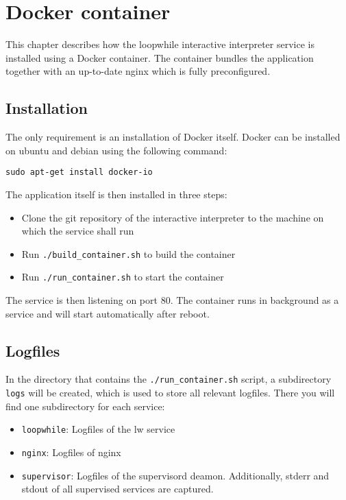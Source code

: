 \chapter{Docker container}
\label{chapter:docker}
This chapter describes how the loopwhile interactive interpreter service
is installed using a Docker container. The container bundles the application
together with an up-to-date nginx which is fully preconfigured.

\section{Installation}
The only requirement is an installation of Docker itself. Docker can be installed on
ubuntu and debian using the following command:

\begin{verbatim}
sudo apt-get install docker-io
\end{verbatim}

The application itself is then installed in three steps:
\begin{itemize}
\item Clone the git repository of the interactive interpreter to the machine
      on which the service shall run
\item Run \verb|./build_container.sh| to build the container
\item Run \verb|./run_container.sh| to start the container
\end{itemize}
The service is then listening on port 80. The container runs in background
as a service and will start automatically after reboot.


\section{Logfiles}
In the directory that contains the \verb|./run_container.sh| script, a subdirectory
\verb|logs| will be created, which is used to store all relevant logfiles. There
you will find one subdirectory for each service:
\begin{itemize}
\item \verb|loopwhile|: Logfiles of the lw service
\item \verb|nginx|: Logfiles of nginx
\item \verb|supervisor|: Logfiles of the supervisord deamon. Additionally,
      stderr and stdout of all supervised services are captured.
\end{itemize}
